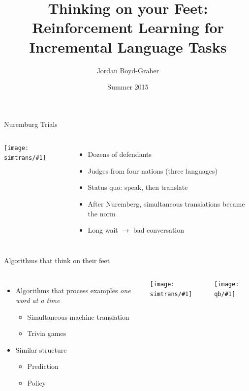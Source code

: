 \documentclass[compress]{beamer}
\title[Thinking on Your Feet]{Thinking on your Feet: Reinforcement Learning for Incremental
Language Tasks}
\author{ Jordan Boyd-Graber}
\date{Summer 2015}
\institute[Boulder] %
{University of Colorado Boulder}
\newcommand{\gfxs}[2]{
\begin{center}
	\texttt{[image: simtrans/\#1]}
\end{center}
}
\newcommand{\gfxq}[2]{
\begin{center}
	\texttt{[image: qb/\#1]}
\end{center}
}
\begin{document}
\frame{
\titlepage
\tiny
}


\begin{frame}{Nuremburg Trials}

\begin{columns}


    \gfxs{nuremberg_trials}{1.0}


    \begin{itemize}
        \item Dozens of defendants
        \item Judges from four nations (three languages)
\pause
        \item Status quo: speak, then translate
\pause
        \item After Nuremberg, simultaneous translations became the
          norm
\pause
        \item Long wait $\rightarrow$ bad conversation
     \end{itemize}

\end{columns}

\end{frame}



\begin{frame}{Algorithms that think on their feet}

\begin{columns}

  \begin{itemize}
     \item Algorithms that process examples \emph{one word at a time}
       \begin{itemize}
         \item Simultaneous machine translation
         \item Trivia games
       \end{itemize}
      \item Similar structure
        \begin{itemize}
          \item Prediction
          \item Policy
        \end{itemize}
  \end{itemize}


  \gfxs{nuremberg_translators}{.7}
  \gfxq{quizbowl}{.7}

\end{columns}

\end{frame}
\end{document}

